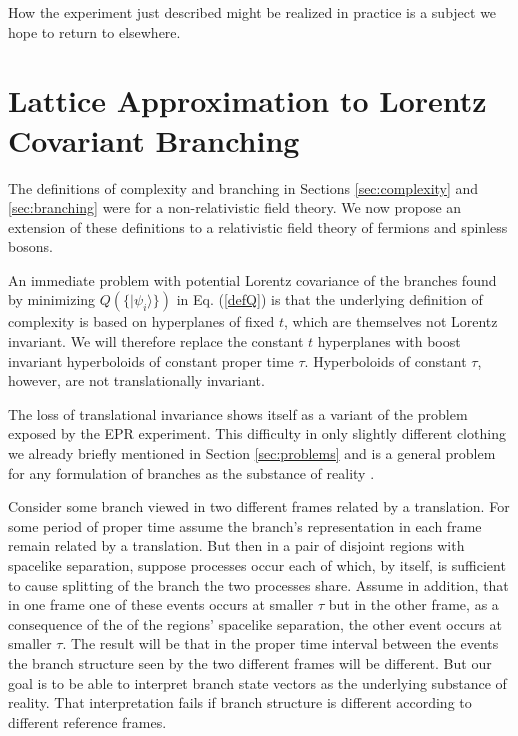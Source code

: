 \documentclass[12pt,amsmath,amssymb,onecolumn]{revtex4-2}
\begin{document}
How the experiment just described
might be realized in practice is
a subject we hope to return to elsewhere.


\section{\label{sec:relativistic}  Lattice Approximation to Lorentz Covariant Branching}

The definitions of complexity and branching 
in Sections \ref{sec:complexity} and \ref{sec:branching}
were for a non-relativistic field theory.
We now propose an extension of these definitions
to a relativistic field theory of fermions and spinless bosons.

An immediate problem with potential Lorentz covariance of the
branches found by minimizing $Q(\{|\psi_i \rangle \})$ in Eq. (\ref{defQ})
is that the underlying definition of complexity is based
on hyperplanes of fixed $t$, which are themselves not Lorentz
invariant.
We will therefore replace the constant $t$ hyperplanes
with boost invariant hyperboloids of constant
proper time $\tau$.
Hyperboloids of constant $\tau$, however, are
not translationally invariant.  

The loss of translational invariance
shows itself as
a variant of the problem exposed by the EPR experiment.
This difficulty in only slightly different clothing 
we already briefly mentioned in Section \ref{sec:problems} and is a general problem for any formulation 
of branches as the substance of reality \cite{Zeh, Zurek, Zurek1, Zurek2,  Wallace, Riedel}.

Consider some branch
viewed in two different frames related by a translation.
For some period of proper time assume the branch's
representation 
in each frame remain related by a translation.
But then in a pair of disjoint regions with
spacelike separation, suppose processes occur each of which,
by itself, is sufficient to cause splitting of the branch
the two processes share. Assume in addition, that in one
frame one of these events occurs at smaller $\tau$ but 
in the other frame, as a consequence of the 
of the regions' spacelike separation, the other event occurs at smaller $\tau$.
The result will be that in the proper time interval between the
events the branch structure seen by the two different 
frames will be different. But our goal is to be able
to interpret branch state vectors as the underlying 
substance of reality. That interpretation
fails if branch structure is different
according to different reference frames.
\end{document}
